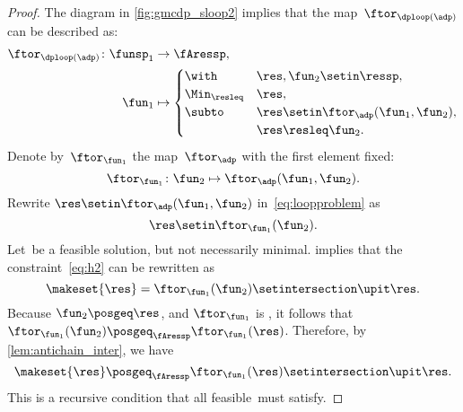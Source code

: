 \begin{proof}
    The diagram in \cref{fig:gmcdp_sloop2} implies that the map~$\ftor_{\dploop(\adp)}$ can be described as:
    \begin{align}
        \ftor_{\dploop(\adp)}\colon\funsp_{1} & \to\fAressp,\label{eq:loopproblem} \\
        \fun_{1}                              & \mapsto\begin{cases}
                                                           \with          & \res,\fun_{2}\setin\ressp,                 \\
                                                           \Min_{\resleq} & \res,                                      \\
                                                           \subto         & \res\setin\ftor_{\adp}(\fun_{1},\fun_{2}), \\
                                                                          & \res\resleq\fun_{2}.
                                                       \end{cases}
    \end{align}
    Denote by~$\ftor_{\fun_{1}}$ the map~$\ftor_{\adp}$ with the first element fixed:
    \begin{equation}
        \ftor_{\fun_{1}}\colon\fun_{2}\mapsto\ftor_{\adp}(\fun_{1},\fun_{2}).
    \end{equation}
    Rewrite $\res\setin\ftor_{\adp}(\fun_{1},\fun_{2})$ in~\cref{eq:loopproblem} as
    \begin{equation}
        \res\setin\ftor_{\fun_{1}}(\fun_{2}).
        \label{eq:h2}
    \end{equation}
    Let~\res be a feasible solution, but not necessarily minimal.
     implies that the constraint~\cref{eq:h2} can be rewritten as
    \begin{equation}
        \makeset{\res}=\ftor_{\fun_{1}}(\fun_{2})\setintersection\upit\res.
        \label{eq:h3}
    \end{equation}
    Because $\fun_{2}\posgeq\res$, and $\ftor_{\fun_{1}}$ is \scottcontinuous, it follows that~$\ftor_{\fun_{1}}(\fun_{2})\posgeq_{\fAressp}\ftor_{\fun_{1}}(\res)$.
    Therefore, by \cref{lem:antichain_inter}, we have
    \begin{equation}
        \makeset{\res}\posgeq_{\fAressp}\ftor_{\fun_{1}}(\res)\setintersection\upit\res.
        \label{eq:fea}
    \end{equation}
    This is a recursive condition that all feasible~\res must satisfy.


\end{proof}
